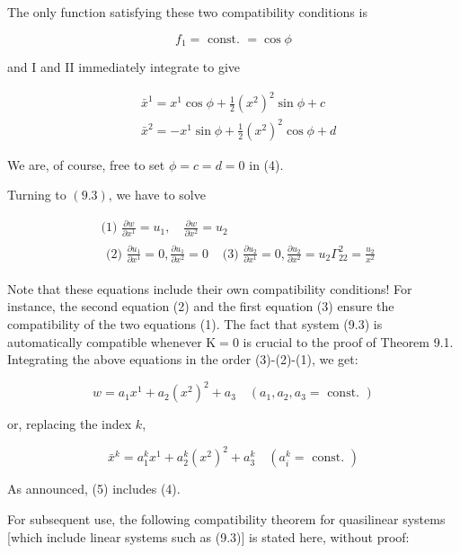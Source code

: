 \documentclass[10pt]{article}
\begin{document}
The only function satisfying these two compatibility conditions is

$$
f_{1}=\text { const. }=\cos \phi
$$

and I and II immediately integrate to give


\begin{align*}
& \bar{x}^{1}=x^{1} \cos \phi+\frac{1}{2}\left(x^{2}\right)^{2} \sin \phi+c \\
& \bar{x}^{2}=-x^{1} \sin \phi+\frac{1}{2}\left(x^{2}\right)^{2} \cos \phi+d \tag{4}
\end{align*}


We are, of course, free to set $\phi=c=d=0$ in (4).

Turning to $(9.3)$, we have to solve

$$
\begin{aligned}
& \text { (1) } \frac{\partial w}{\partial x^{1}}=u_{1}, \quad \frac{\partial w}{\partial x^{2}}=u_{2} \\
& \begin{array}{ll}
\text { (2) } \frac{\partial u_{1}}{\partial x^{1}}=0, \frac{\partial u_{1}}{\partial x^{2}}=0 & \text { (3) } \frac{\partial u_{2}}{\partial x^{1}}=0, \frac{\partial u_{2}}{\partial x^{2}}=u_{2} \Gamma_{22}^{2}=\frac{u_{2}}{x^{2}}
\end{array}
\end{aligned}
$$

Note that these equations include their own compatibility conditions! For instance, the second equation (2) and the first equation (3) ensure the compatibility of the two equations (1). The fact that system (9.3) is automatically compatible whenever $\mathrm{K}=0$ is crucial to the proof of Theorem 9.1. Integrating the above equations in the order (3)-(2)-(1), we get:

$$
w=a_{1} x^{1}+a_{2}\left(x^{2}\right)^{2}+a_{3} \quad\left(a_{1}, a_{2}, a_{3}=\text { const. }\right)
$$

or, replacing the index $k$,


\begin{equation*}
\bar{x}^{k}=a_{1}^{k} x^{1}+a_{2}^{k}\left(x^{2}\right)^{2}+a_{3}^{k} \quad\left(a_{i}^{k}=\text { const. }\right) \tag{5}
\end{equation*}


As announced, (5) includes (4).

For subsequent use, the following compatibility theorem for quasilinear systems [which include linear systems such as (9.3)] is stated here, without proof:
\end{document}
